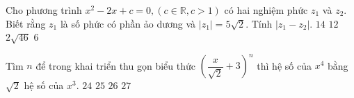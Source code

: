 \begin{ex}%
Cho phương trình $ x^2 - 2x + c = 0, (c \in \mathbb{R}, c > 1) $ có hai nghiệm phức $ z_1 $ và $ z_2 $. Biết rằng $ z_1 $ là số phức có phần ảo dương và $ |z_1| = 5 \sqrt{2} $. Tính $ | z_1 - z_2 | $.	
	\choice
	{\True $ 14 $}
	{$ 12 $}
	{$ 2 \sqrt{46} $}
	{$ 6 $}
\end{ex}	
\begin{ex}%
Tìm $ n $ để trong khai triển thu gọn biểu thức $ \left ( \dfrac{x}{ \sqrt{2} } + 3 \right )^n $ thì hệ số của $ x^4 $ bằng $ \sqrt{2} $ hệ số của $ x^3 $.	
	\choice
	{$ 24 $}
	{$ 25 $}
	{$ 26 $}
	{\True $ 27 $}
\end{ex}	
